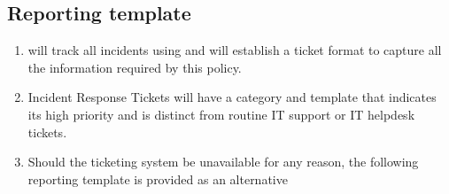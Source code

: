 \documentclass[../main.tex]{subfiles}
\begin{document}
\subsection{Reporting template}
\begin{enumerate}
    \item \CompanyName{} will track all incidents using \TicketPortal{} and will establish a ticket format to capture all the information required by this policy.
    \item Incident Response Tickets will have a category and template that indicates its high priority and is distinct from routine IT support or IT helpdesk tickets.
    \item Should the ticketing system be unavailable for any reason, the following reporting template is provided as an alternative
\end{enumerate}
\newpage
{}
\end{document}
